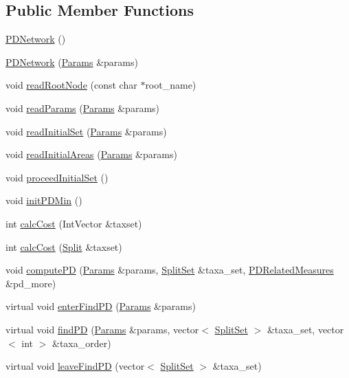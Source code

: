 \subsection*{Public Member Functions}
\begin{DoxyCompactItemize}
\item 
\hyperlink{classPDNetwork_a26121c6a073dcaabb9c49e2b2144fde4}{PDNetwork} ()
\item 
\hyperlink{classPDNetwork_aba3316a0d0ed8fb67dce12fd9cc74b39}{PDNetwork} (\hyperlink{structParams}{Params} \&params)
\item 
void \hyperlink{classPDNetwork_a9a178e8280d5fc19f40b15903fc08320}{readRootNode} (const char $\ast$root\_\-name)
\item 
void \hyperlink{classPDNetwork_ab220164dcf5705a35884005476488262}{readParams} (\hyperlink{structParams}{Params} \&params)
\item 
void \hyperlink{classPDNetwork_ad228e5aa31704ab00b4689bcde67551c}{readInitialSet} (\hyperlink{structParams}{Params} \&params)
\item 
void \hyperlink{classPDNetwork_ad63b20eaa9bc56a456350d590f1c574e}{readInitialAreas} (\hyperlink{structParams}{Params} \&params)
\item 
void \hyperlink{classPDNetwork_a8612c1f67250fad10a5585ec727019ab}{proceedInitialSet} ()
\item 
void \hyperlink{classPDNetwork_ae7dc55bf1b3d05baa5ee85f58709ccc3}{initPDMin} ()
\item 
int \hyperlink{classPDNetwork_ad93961e85ba88b91ce1afce0ba594fa7}{calcCost} (IntVector \&taxset)
\item 
int \hyperlink{classPDNetwork_a14b0a52d17495905424fb42b81d61af3}{calcCost} (\hyperlink{classSplit}{Split} \&taxset)
\item 
void \hyperlink{classPDNetwork_a7a4584a81ad96405c27083bc436ab9ce}{computePD} (\hyperlink{structParams}{Params} \&params, \hyperlink{classSplitSet}{SplitSet} \&taxa\_\-set, \hyperlink{structPDRelatedMeasures}{PDRelatedMeasures} \&pd\_\-more)
\item 
virtual void \hyperlink{classPDNetwork_a43fb83d870d86c62c10e57e8eac7ecdd}{enterFindPD} (\hyperlink{structParams}{Params} \&params)
\item 
virtual void \hyperlink{classPDNetwork_ae481d52c7f411e1fa1f768746329130b}{findPD} (\hyperlink{structParams}{Params} \&params, vector$<$ \hyperlink{classSplitSet}{SplitSet} $>$ \&taxa\_\-set, vector$<$ int $>$ \&taxa\_\-order)
\item 
virtual void \hyperlink{classPDNetwork_a22260c3a934e8f657451066bb45d9ce2}{leaveFindPD} (vector$<$ \hyperlink{classSplitSet}{SplitSet} $>$ \&taxa\_\-set)

\end{DoxyCompactItemize}
